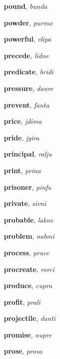\documentclass[12pt]{book}
\begin{document}
\begin{description}
\item[ ] \textbf{pound}, \textit{bunda}

\item[ ] \textbf{powder}, \textit{purmo}

\item[ ] \textbf{powerful}, \textit{vlipa}

\item[ ] \textbf{precede}, \textit{lidne}

\item[ ] \textbf{predicate}, \textit{bridi}

\item[ ] \textbf{pressure}, \textit{danre}

\item[ ] \textbf{prevent}, \textit{fanta}

\item[ ] \textbf{price}, \textit{jdima}

\item[ ] \textbf{pride}, \textit{jgira}

\item[ ] \textbf{principal}, \textit{ralju}

\item[ ] \textbf{print}, \textit{prina}

\item[ ] \textbf{prisoner}, \textit{pinfu}

\item[ ] \textbf{private}, \textit{sivni}

\item[ ] \textbf{probable}, \textit{lakne}

\item[ ] \textbf{problem}, \textit{nabmi}

\item[ ] \textbf{process}, \textit{pruce}

\item[ ] \textbf{procreate}, \textit{rorci}

\item[ ] \textbf{produce}, \textit{cupra}

\item[ ] \textbf{profit}, \textit{prali}

\item[ ] \textbf{projectile}, \textit{danti}

\item[ ] \textbf{promise}, \textit{nupre}

\item[ ] \textbf{prose}, \textit{prosa}


\end{description}
\end{document}
